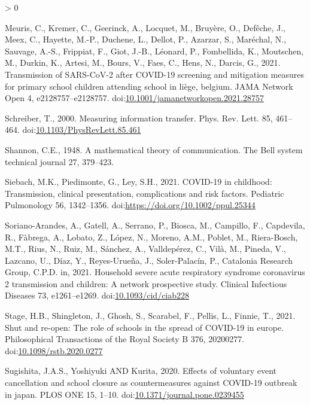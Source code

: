 \documentclass[]{elsarticle} %
\newlength{\cslhangindent}
\newenvironment{CSLReferences}[2] %
 {%
  \setlength{\parindent}{0pt}
  \ifodd #1 \everypar{\setlength{\hangindent}{\cslhangindent}}\ignorespaces\fi
  \ifnum #2 > 0
  \setlength{\parskip}{#2\baselineskip}
  \fi
 }%
 {}
\begin{document}
\begin{CSLReferences}{1}{0}
\leavevmode\hypertarget{ref-meuris2021transmission}{}%
Meuris, C., Kremer, C., Geerinck, A., Locquet, M., Bruyère, O., Defêche, J., Meex, C., Hayette, M.-P., Duchene, L., Dellot, P., Azarzar, S., Maréchal, N., Sauvage, A.-S., Frippiat, F., Giot, J.-B., Léonard, P., Fombellida, K., Moutschen, M., Durkin, K., Artesi, M., Bours, V., Faes, C., Hens, N., Darcis, G., 2021. Transmission of SARS-CoV-2 after COVID-19 screening and mitigation measures for primary school children attending school in liège, belgium. JAMA Network Open 4, e2128757--e2128757. doi:\href{https://doi.org/10.1001/jamanetworkopen.2021.28757}{10.1001/jamanetworkopen.2021.28757}

\leavevmode\hypertarget{ref-schreiber2000measuring}{}%
Schreiber, T., 2000. Measuring information transfer. Phys. Rev. Lett. 85, 461--464. doi:\href{https://doi.org/10.1103/PhysRevLett.85.461}{10.1103/PhysRevLett.85.461}

\leavevmode\hypertarget{ref-shannon1948mathematical}{}%
Shannon, C.E., 1948. A mathematical theory of communication. The Bell system technical journal 27, 379--423.

\leavevmode\hypertarget{ref-siebach2021childhood}{}%
Siebach, M.K., Piedimonte, G., Ley, S.H., 2021. COVID-19 in childhood: Transmission, clinical presentation, complications and risk factors. Pediatric Pulmonology 56, 1342--1356. doi:\url{https://doi.org/10.1002/ppul.25344}

\leavevmode\hypertarget{ref-sorianoarandes2021household}{}%
Soriano-Arandes, A., Gatell, A., Serrano, P., Biosca, M., Campillo, F., Capdevila, R., Fàbrega, A., Lobato, Z., López, N., Moreno, A.M., Poblet, M., Riera-Bosch, M.T., Rius, N., Ruiz, M., Sánchez, A., Valldepérez, C., Vilà, M., Pineda, V., Lazcano, U., Díaz, Y., Reyes-Urueña, J., Soler-Palacín, P., Catalonia Research Group, C.P.D. in, 2021. Household severe acute respiratory syndrome coronavirus 2 transmission and children: A network prospective study. Clinical Infectious Diseases 73, e1261--e1269. doi:\href{https://doi.org/10.1093/cid/ciab228}{10.1093/cid/ciab228}

\leavevmode\hypertarget{ref-stage2021shut}{}%
Stage, H.B., Shingleton, J., Ghosh, S., Scarabel, F., Pellis, L., Finnie, T., 2021. Shut and re-open: The role of schools in the spread of COVID-19 in europe. Philosophical Transactions of the Royal Society B 376, 20200277. doi:\href{https://doi.org/10.1098/rstb.2020.0277}{10.1098/rstb.2020.0277}

\leavevmode\hypertarget{ref-yoshiyuki2020effects}{}%
Sugishita, J.A.S., Yoshiyuki AND Kurita, 2020. Effects of voluntary event cancellation and school closure as countermeasures against COVID-19 outbreak in japan. PLOS ONE 15, 1--10. doi:\href{https://doi.org/10.1371/journal.pone.0239455}{10.1371/journal.pone.0239455}


\end{CSLReferences}
\end{document}
